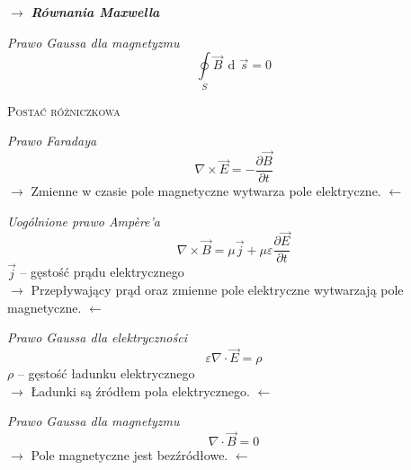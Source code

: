 \documentclass[12pt]{article}
\newenvironment{wzor}[1]{\par{\Large $\longrightarrow$ \textit{#1}}}
    {\newline {\color{grey} \rule{\linewidth}{0.3pt}}}
\DeclareMathOperator{\der}{\operatorname{d}\!}
\begin{document}
\begin{wzor}{\textbf{Równania Maxwella}}
    \par \textit{Prawo Gaussa dla magnetyzmu}
    \begin{equation}
        \oint\limits_S \Vec{B} \, \der\Vec{s} = 0
    \end{equation}
    
    \par {\large \textsc{Postać różniczkowa}}
    \par \textit{Prawo Faradaya}
    \begin{equation}
        \nabla \times \Vec{E} = - \frac{\partial \Vec{B}}{\partial t}
    \end{equation}
    $\rightarrow$ Zmienne w czasie pole magnetyczne wytwarza pole elektryczne. $\leftarrow$
    
    \par \textit{Uogólnione prawo Ampère'a}
    \begin{equation}
        \nabla \times \Vec{B} = \mu \Vec{j} + \mu \varepsilon \frac{\partial \Vec{E}}{\partial t}
    \end{equation}
    $\Vec{j}$ -- gęstość prądu elektrycznego\\
    $\rightarrow$ Przepływający prąd oraz zmienne pole elektryczne wytwarzają pole magnetyczne.
    $\leftarrow$
    
    \newpage
    
    \par \textit{Prawo Gaussa dla elektryczności}
    \begin{equation}
        \varepsilon \nabla \cdot \Vec{E} = \rho
    \end{equation}
    $\rho$ -- gęstość ładunku elektrycznego\\
    $\rightarrow$ Ładunki są źródłem pola elektrycznego. $\leftarrow$
    
    \par \textit{Prawo Gaussa dla magnetyzmu}
    \begin{equation}
        \nabla \cdot \Vec{B} = 0
    \end{equation}
    $\rightarrow$ Pole magnetyczne jest bezźródłowe. $\leftarrow$
\end{wzor}
\end{document}
